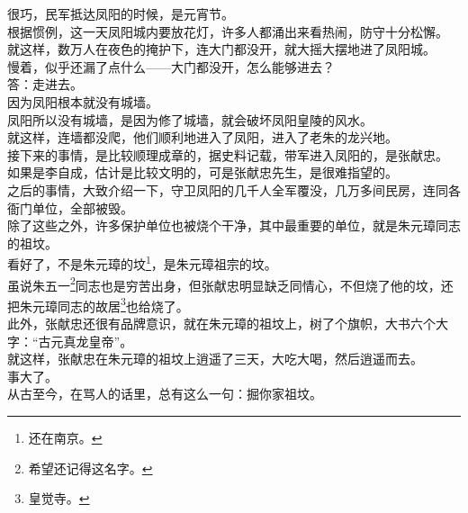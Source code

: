 \begin{multicols}{\theparacolNo}
很巧，民军抵达凤阳的时候，是元宵节。\\

根据惯例，这一天凤阳城内要放花灯，许多人都涌出来看热闹，防守十分松懈。\\

就这样，数万人在夜色的掩护下，连大门都没开，就大摇大摆地进了凤阳城。\\

慢着，似乎还漏了点什么——大门都没开，怎么能够进去？\\

答：走进去。\\

因为凤阳根本就没有城墙。\\

凤阳所以没有城墙，是因为修了城墙，就会破坏凤阳皇陵的风水。\\

就这样，连墙都没爬，他们顺利地进入了凤阳，进入了老朱的龙兴地。\\

接下来的事情，是比较顺理成章的，据史料记载，带军进入凤阳的，是张献忠。\\

如果是李自成，估计是比较文明的，可是张献忠先生，是很难指望的。\\

之后的事情，大致介绍一下，守卫凤阳的几千人全军覆没，几万多间民房，连同各衙门单位，全部被毁。\\

除了这些之外，许多保护单位也被烧个干净，其中最重要的单位，就是朱元璋同志的祖坟。\\

看好了，不是朱元璋的坟\footnote{还在南京。}，是朱元璋祖宗的坟。\\

虽说朱五一\footnote{希望还记得这名字。}同志也是穷苦出身，但张献忠明显缺乏同情心，不但烧了他的坟，还把朱元璋同志的故居\footnote{皇觉寺。}也给烧了。\\

此外，张献忠还很有品牌意识，就在朱元璋的祖坟上，树了个旗帜，大书六个大字：“古元真龙皇帝”。\\

就这样，张献忠在朱元璋的祖坟上逍遥了三天，大吃大喝，然后逍遥而去。\\

事大了。\\

从古至今，在骂人的话里，总有这么一句：掘你家祖坟。\\


\end{multicols}
